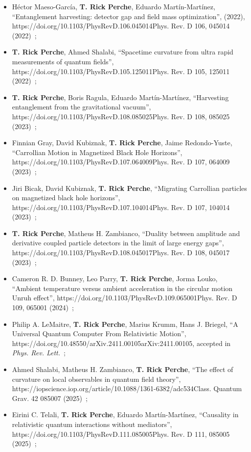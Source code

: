 \documentclass[letterpaper,12pt,titlepage,oneside,final]{book}
\newcommand{\href}[1]{#1} %
\begin{document}
\begin{itemize}
    \item[(21)] Héctor Maeso-García, \textbf{T. Rick Perche}, Eduardo Martín-Martínez, ``Entanglement harvesting: detector gap and field mass optimization'', (2022), \href{https://doi.org/10.1103/PhysRevD.106.045014}{Phys. Rev. D 106, 045014 (2022)}~\cite{hectorMass};
    \item[(22)] \textbf{T. Rick Perche}, Ahmed Shalabi, ``Spacetime curvature from ultra rapid measurements of quantum fields'', \href{https://doi.org/10.1103/PhysRevD.105.125011}{Phys. Rev. D 105, 125011 (2022)}~\cite{ahmed};
    \item[(23)] \textbf{T. Rick Perche}, Boris Ragula, Eduardo Martín-Martínez, ``Harvesting entanglement from the gravitational vacuum'', \href{https://doi.org/10.1103/PhysRevD.108.085025}{Phys. Rev. D 108, 085025 (2023)}~\cite{boris};
    \item[(24)] Finnian Gray, David Kubiznak, \textbf{T. Rick Perche}, Jaime Redondo-Yuste, ``Carrollian Motion in Magnetized Black Hole Horizons'', \href{https://doi.org/10.1103/PhysRevD.107.064009}{Phys. Rev. D 107, 064009 (2023)}~\cite{jaime};
    \item[(25)] Jiri Bicak, David Kubiznak, \textbf{T. Rick Perche}, ``Migrating Carrollian particles on magnetized black hole horizons'', \href{https://doi.org/10.1103/PhysRevD.107.104014}{Phys. Rev. D 107, 104014 (2023)}~\cite{jiri};
    \item[(26)] \textbf{T. Rick Perche}, Matheus H. Zambianco, ``Duality between amplitude and derivative coupled particle detectors in the limit of large energy gaps'', \href{https://doi.org/10.1103/PhysRevD.108.045017}{Phys. Rev. D 108, 045017 (2023)}~\cite{dualityGap};
    \item[(27)] Cameron R. D. Bunney, Leo Parry, \textbf{T. Rick Perche}, Jorma Louko, ``Ambient temperature versus ambient acceleration in the circular motion Unruh effect'', \href{https://doi.org/10.1103/PhysRevD.109.065001}{Phys. Rev. D 109, 065001 (2024)}~\cite{JormaAndI};
    \item[(28)] Philip A. LeMaitre, \textbf{T. Rick Perche}, Marius Krumm, Hans J. Briegel, ``A Universal Quantum Computer From Relativistic Motion'', \href{https://doi.org/10.48550/arXiv.2411.00105}{arXiv:2411.00105}, accepted in \textit{Phys. Rev. Lett.}~\cite{Phil};
    \item[(28)] Ahmed Shalabi, Matheus H. Zambianco, \textbf{T. Rick Perche}, ``The effect of curvature on local observables in quantum field theory'', \href{https://iopscience.iop.org/article/10.1088/1361-6382/adc534}{Class. Quantum Grav. 42 085007 (2025)}~\cite{mathahmed};
    \item[(29)] Eirini C. Telali, \textbf{T. Rick Perche}, Eduardo Martín-Martínez, ``Causality in relativistic quantum interactions without mediators'', \href{https://doi.org/10.1103/PhysRevD.111.085005}{Phys. Rev. D 111, 085005 (2025)}~\cite{eirini};
\end{itemize}
\end{document}
